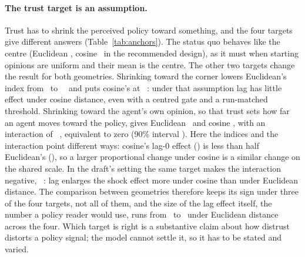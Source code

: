 \documentclass[11pt]{article}
\begin{document}
\paragraph{The trust target is an assumption.}
Trust has to shrink the perceived policy toward something, and the four targets give different answers (Table~\ref{tab:anchors}).
The status quo behaves like the centre (Euclidean \VTCentredRunStatusQuoEucIdx, cosine \VTCentredRunStatusQuoCosIdx\ in the recommended design), as it must when starting opinions are uniform and their mean is the centre.
The other two targets change the result for both geometries.
Shrinking toward the corner lowers Euclidean's index from \VTCentredRunCentreEucIdx\ to \VTCentredRunCornerEucIdx\ \VTCentredRunCornerEucIdxCI\ and puts cosine's at \VTCentredRunCornerCosIdx\ \VTCentredRunCornerCosIdxCI: under that assumption lag has little effect under cosine distance, even with a centred gate and a run-matched threshold.
Shrinking toward the agent's own opinion, so that trust sets how far an agent moves toward the policy, gives Euclidean \VTCentredRunOwnEucIdx\ and cosine \VTCentredRunOwnCosIdx, with an interaction of \VTCentredRunOwnInter\ \VTCentredRunOwnCI, equivalent to zero (90\% interval \VTCentredRunOwnCINinety).
Here the indices and the interaction point different ways: cosine's lag-0 effect (\VTCentredRunOwnCosZero) is less than half Euclidean's (\VTCentredRunOwnEucZero), so a larger proportional change under cosine is a similar change on the shared scale.
In the draft's setting the same target makes the interaction negative, \VTUnitRawOwnInter\ \VTUnitRawOwnCI: lag enlarges the shock effect more under cosine than under Euclidean distance.
The comparison between geometries therefore keeps its sign under three of the four targets, not all of them, and the size of the lag effect itself, the number a policy reader would use, runs from \VTargetEucMin\ to \VTargetEucMax\ under Euclidean distance across the four.
Which target is right is a substantive claim about how distrust distorts a policy signal; the model cannot settle it, so it has to be stated and varied.

\begin{table}[t]
\centering\small
\caption{Trust targets in the recommended design (centred gate, run-matched threshold recalibrated for each target, anchor pull): lag index per geometry (95\% CI), lag-0 relative shock effect (Euclidean / cosine) and the paired interaction; $^{=}$ marks equivalence to zero.}
\label{tab:anchors}

\end{table}
\end{document}
